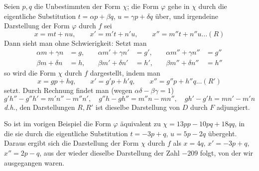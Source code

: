 Seien $p,q$ die Unbestimmten der Form $\chi$; die Form $\varphi$ gehe
in $\chi$ durch die eigentliche Substitution $t=\alpha p+\beta q$, $u=\gamma p+\delta q$ über,
und irgendeine Darstellung der Form $\varphi$ durch $f$ sei
\[
x=mt+nu,\qquad x'=m't+n'u,\qquad x''=m''t+n''u\ldots(R)
\]
Dann sieht man ohne Schwierigkeit: Setzt man
\[
\begin{aligned}
\alpha m+\gamma n&=g,&\quad \alpha m'+\gamma n'&=g',&\quad \alpha m''+\gamma n''&=g''\\
\beta m+\delta n&=h,&\quad \beta m'+\delta n'&=h',&\quad \beta m''+\delta n''&=h''
\end{aligned}
\]
so wird die Form $\chi$ durch $f$ dargestellt, indem man
\[
x=gp+hq,\qquad x'=g'p+h'q,\qquad x''=g''p+h''q\ldots(R')
\]
setzt. Durch Rechnung findet man (wegen $\alpha\delta-\beta\gamma=1$)
\[
g'h''-g''h'=m'n''-m''n',\quad
g''h-gh''=m''n-mn'',\quad
gh'-g'h=mn'-m'n
\]
\textit{d.h.}, den Darstellungen $R,R'$ ist dieselbe Darstellung von
$D$ durch $F$ adjungiert.

So ist im vorigen Beispiel die Form $\varphi$ äquivalent zu
$\chi=13pp-10pq+18qq$, in die sie durch die eigentliche Substitution
$t=-3p+q$, $u=5p-2q$ übergeht. Daraus ergibt sich die Darstellung der Form
$\chi$ durch $f$ als $x=4q$, $x'=-3p+q$, $x''=2p-q$, aus der wieder dieselbe
Darstellung der Zahl $-209$ folgt, von der wir ausgegangen waren.

